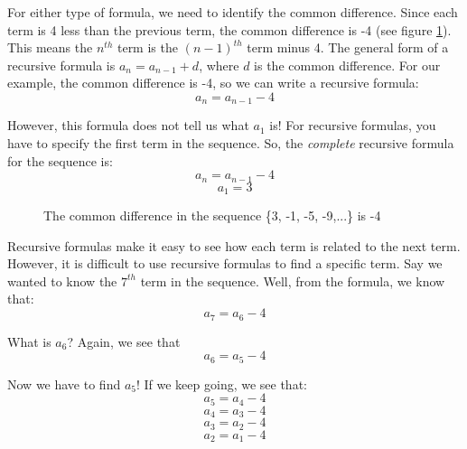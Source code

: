 For either type of formula, we need to identify the common difference. 
Since each term is 4 less than the previous term, the common 
difference is -4 (see figure \ref{fig:comdiff}). This means the 
$n^{th}$ term is the $(n-1)^{th}$ term minus 4. The general form of a 
recursive formula is $a_n = a_{n-1} + d$, where $d$ is the common 
difference. For our example, the common difference is -4, so we can 
write a recursive formula:
$$a_n = a_{n-1}-4$$

However, this formula does not tell us what $a_1$ is! For recursive 
formulas, you have to specify the first term in the sequence. So, the 
\textit{complete} recursive formula for the sequence is:
$$a_n = a_{n-1}-4$$
$$a_1 = 3$$

\begin{figure}[H]
\centering
    \caption{The common difference in the sequence \{3, -1, -5, -9,...\} is -4}
    \label{fig:comdiff}
\end{figure}

Recursive formulas make it easy to see how each term is related to 
the next term. However, it is difficult to use recursive formulas to 
find a specific term. Say we wanted to know the $7^{th}$ term in the 
sequence. Well, from the formula, we know that:
$$a_7 = a_6 - 4$$

What is $a_6$? Again, we see that
$$a_6 = a_5 - 4$$

Now we have to find $a_5$! If we keep going, we see that:
$$a_5 = a_4 - 4$$
$$a_4 = a_3 - 4$$
$$a_3 = a_2 - 4$$
$$a_2 = a_1 - 4$$

